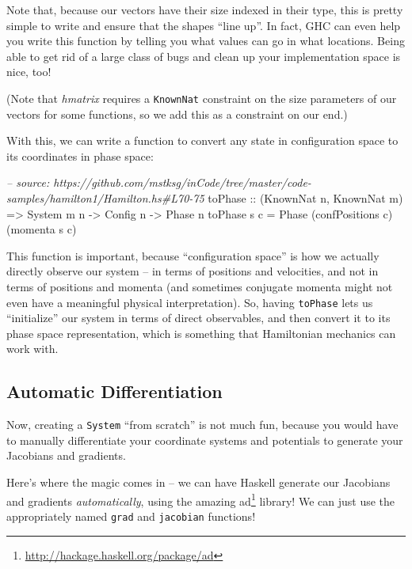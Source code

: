 \documentclass[]{article}
\newenvironment{Shaded}{}{}
\newcommand{\DataTypeTok}[1]{\textcolor[rgb]{0.56,0.13,0.00}{#1}}
\newcommand{\CommentTok}[1]{\textcolor[rgb]{0.38,0.63,0.69}{\textit{#1}}}
\newcommand{\OtherTok}[1]{\textcolor[rgb]{0.00,0.44,0.13}{#1}}
\newcommand{\FunctionTok}[1]{\textcolor[rgb]{0.02,0.16,0.49}{#1}}
\newcommand{\NormalTok}[1]{#1}
\renewcommand{\href}[2]{#2\footnote{\url{#1}}}
\begin{document}
Note that, because our vectors have their size indexed in their type, this is
pretty simple to write and ensure that the shapes ``line up''. In fact, GHC can
even help you write this function by telling you what values can go in what
locations. Being able to get rid of a large class of bugs and clean up your
implementation space is nice, too!

(Note that \emph{hmatrix} requires a \texttt{KnownNat} constraint on the size
parameters of our vectors for some functions, so we add this as a constraint on
our end.)

With this, we can write a function to convert any state in configuration space
to its coordinates in phase space:

\begin{Shaded}
\begin{Highlighting}[]
\CommentTok{-- source: https://github.com/mstksg/inCode/tree/master/code-samples/hamilton1/Hamilton.hs#L70-75}
\NormalTok{toPhase}
\OtherTok{    ::}\NormalTok{ (}\DataTypeTok{KnownNat}\NormalTok{ n, }\DataTypeTok{KnownNat}\NormalTok{ m)}
    \OtherTok{=>} \DataTypeTok{System}\NormalTok{ m n}
    \OtherTok{->} \DataTypeTok{Config}\NormalTok{ n}
    \OtherTok{->} \DataTypeTok{Phase}\NormalTok{ n}
\NormalTok{toPhase s c }\FunctionTok{=} \DataTypeTok{Phase}\NormalTok{ (confPositions c) (momenta s c)}
\end{Highlighting}
\end{Shaded}

This function is important, because ``configuration space'' is how we actually
directly observe our system -- in terms of positions and velocities, and not in
terms of positions and momenta (and sometimes conjugate momenta might not even
have a meaningful physical interpretation). So, having \texttt{toPhase} lets us
``initialize'' our system in terms of direct observables, and then convert it to
its phase space representation, which is something that Hamiltonian mechanics
can work with.

\subsection{Automatic Differentiation}\label{automatic-differentiation}

Now, creating a \texttt{System} ``from scratch'' is not much fun, because you
would have to manually differentiate your coordinate systems and potentials to
generate your Jacobians and gradients.

Here's where the magic comes in -- we can have Haskell generate our Jacobians
and gradients \emph{automatically}, using the amazing
\href{http://hackage.haskell.org/package/ad}{ad} library! We can just use the
appropriately named \texttt{grad} and \texttt{jacobian} functions!
\end{document}
